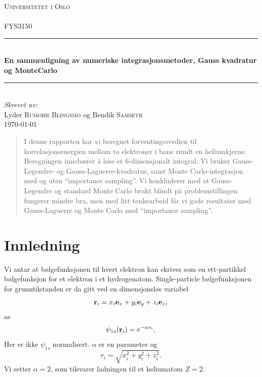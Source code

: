 \documentclass[11pt]{article}
\begin{document}
\begin{titlepage}
  \newcommand{\HRule}{\rule{\linewidth}{0.5mm}}
  \center
  \textsc{\LARGE Universitetet i Oslo}\\[1.5cm] %
  \textsc{\Large }\\[0.5cm] %
  \textsc{\large FYS3150}\\[0.5cm] %
  \HRule \\[0.4cm]
  { \huge \bfseries En sammenligning av numeriske integrasjonsmetoder, Gauss kvadratur og MonteCarlo}\\[0.4cm] %
  \HRule \\[1.5cm]
  \Large \emph{Skrevet av:}\\
  Lyder \textsc{Rumohr Blingsmo} og Bendik \textsc{Samseth}\\[3cm]
  {\large \today}\\[3cm]
  \vfill
\end{titlepage}

\begin{abstract}
  I denne rapporten har vi beregnet forventingsverdien til korrelasjonsenergien
  mellom to elektroner i bane rundt en heliumkjerne. Beregningen
  innebærer å løse et 6-dimensjonalt integral. Vi bruker
  Gauss-Legendre- og Gauss-Laguerre-kvadratur, samt
  Monte Carlo-integrasjon med og uten ``importance sampling''. Vi
  konkluderer med at Gauss-Legendre og standard Monte Carlo brukt
  blindt på problemstillingen fungerer mindre bra, men med litt
  tenkearbeid får vi gode resultater med Gauss-Laguerre og Monte Carlo
  med ``importance sampling''.  
\end{abstract}

\section{Innledning}

Vi antar at bølgefunksjonen til hvert elektron kan skrives som en ett-partikkel
bølgefunksjon for et elektron i et hydrogenatom. Single-particle bølgefunksjonen for 
grunntilstanden er da gitt ved en dimensjonsløs variabel
\[
   {\bf r}_i =  x_i {\bf e}_x + y_i {\bf e}_y +z_i {\bf e}_z ,
\]
as
\[
   \psi_{1s}({\bf r}_i)  =   e^{-\alpha r_i},
\]
Her er ikke $\psi_{1s}$ normalisert. $\alpha$ er en parameter og
\[
r_i = \sqrt{x_i^2+y_i^2+z_i^2}.
\]
Vi setter $\alpha=2$, som tilsvarer ladningen til et heliumatom $Z=2$. 
\end{document}

